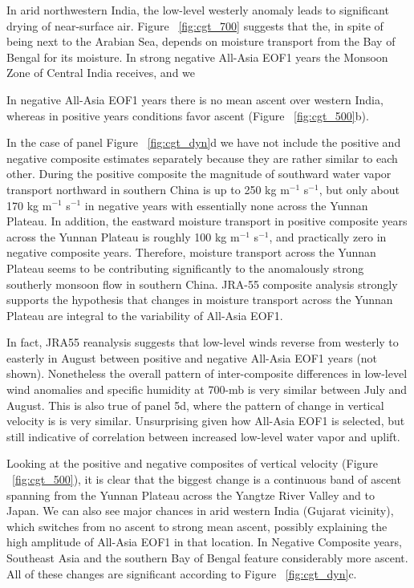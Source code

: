 	In arid northwestern India, the low-level westerly anomaly leads to significant drying of near-surface air. Figure ~\ref{fig:cgt_700} suggests that the, in spite of being next to the Arabian Sea, depends on moisture transport from the Bay of Bengal for its moisture. In strong negative All-Asia EOF1 years the Monsoon Zone of Central India receives, and we
	
	In negative All-Asia EOF1 years there is no mean ascent over western India, whereas in positive years conditions favor ascent (Figure  ~\ref{fig:cgt_500}b).
	
	In the case of panel Figure ~\ref{fig:cgt_dyn}d we have not include the positive and negative composite estimates separately because they are rather similar to each other. During the positive composite the magnitude of southward water vapor transport northward in southern China is up to 250 kg m$^{-1}$ s$^{-1}$, but only about 170 kg m$^{-1}$ s$^{-1}$ in negative years with essentially none across the Yunnan Plateau.  In addition, the eastward moisture transport in positive composite years across the Yunnan Plateau is roughly 100 kg m$^{-1}$ s$^{-1}$, and practically zero in negative composite years. Therefore, moisture transport across the Yunnan Plateau seems to be contributing significantly to the anomalously strong southerly monsoon flow in southern China. JRA-55 composite analysis strongly supports the hypothesis that changes in moisture transport across the Yunnan Plateau are integral to the variability of All-Asia EOF1.
						
	In fact, JRA55 reanalysis suggests that low-level winds reverse from westerly to easterly in August between positive and negative All-Asia EOF1 years (not shown). Nonetheless the overall pattern of inter-composite differences in low-level wind anomalies and specific humidity at 700-mb is very similar between July and August. This is also true of panel 5d, where the pattern of change in vertical velocity is is very similar. Unsurprising given how All-Asia EOF1 is selected, but still indicative of correlation between increased low-level water vapor and uplift.
			
	Looking at the positive and negative composites of vertical velocity (Figure ~\ref{fig:cgt_500}), it is clear that the biggest change is a continuous band of ascent spanning from the Yunnan Plateau across the Yangtze River Valley and to Japan. We can also see major chances in arid western India (Gujarat vicinity), which switches from no ascent to strong mean ascent, possibly explaining the high amplitude of All-Asia EOF1 in that location. In Negative Composite years, Southeast Asia and the southern Bay of Bengal feature considerably more ascent. All of these changes are significant according to Figure ~\ref{fig:cgt_dyn}c.
	
